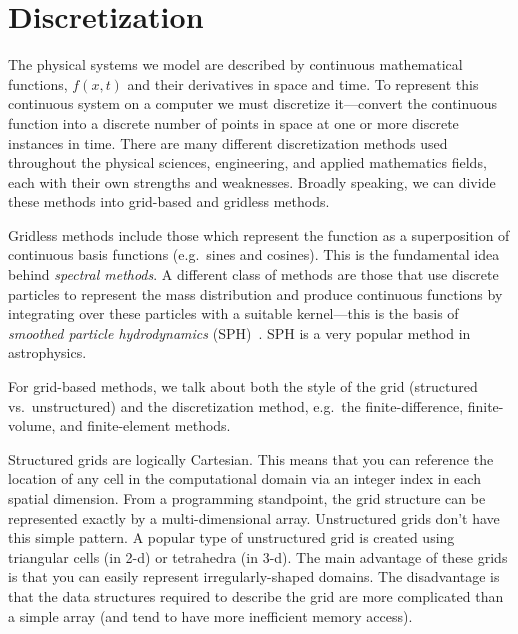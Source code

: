 \label{ch:fv}

\section{Discretization}

The physical systems we model are described by continuous mathematical
functions, $f(x,t)$ and their derivatives in space and time.  To
represent this continuous system on a computer we must discretize
it---convert the continuous function into a discrete number of points
in space at one or more discrete instances in time.
There are many different discretization methods used throughout the
physical sciences, engineering, and applied mathematics fields, each
with their own strengths and weaknesses.  Broadly speaking, we can
divide these methods into grid-based and gridless methods.


Gridless methods include those which represent the function as a
superposition of continuous basis functions (e.g.\ sines and cosines).
This is the fundamental idea behind {\em spectral methods}.  A different
class of methods are those that use discrete particles to represent the
mass distribution and produce continuous functions by integrating
over these particles with a suitable kernel---this is the basis of
{\em smoothed particle hydrodynamics} (SPH)~\cite{SPH}.  SPH is a very popular
method in astrophysics.

For grid-based methods, we talk about both the style of the grid
(structured vs.\ unstructured) and the discretization method, e.g.\ the
finite-difference, finite-volume, and finite-element methods.

Structured grids are logically Cartesian.  This means that you can
reference the location of any cell in the computational domain via an
integer index in each spatial dimension.  From a programming
standpoint, the grid structure can be represented exactly by a
multi-dimensional array.  Unstructured grids don't have this simple
pattern.  A popular type of unstructured grid is created using
triangular cells (in 2-d) or tetrahedra (in 3-d).   The main advantage of these grids is that you can easily
represent irregularly-shaped domains.  The disadvantage is that the
data structures required to describe the grid are more complicated
than a simple array (and tend to have more inefficient memory access).

